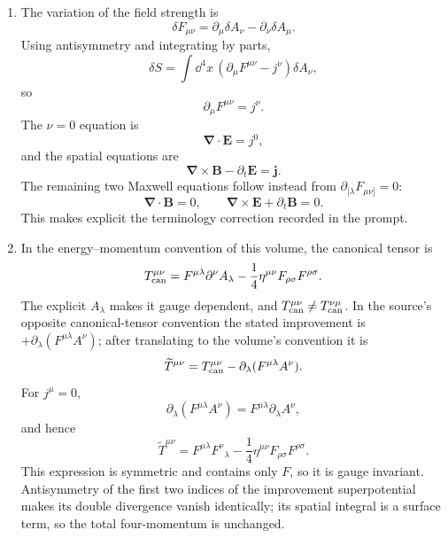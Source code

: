 \begin{enumerate}
\begin{enumerate}
\item
The variation of the field strength is
\[
 \delta F_{\mu\nu}
 =\partial_\mu\delta A_\nu-\partial_\nu\delta A_\mu.
\]
Using antisymmetry and integrating by parts,
\[
 \delta S
 =\int \dd^4x\,
 \left(\partial_\mu F^{\mu\nu}-j^\nu\right)\delta A_\nu,
\]
so
\[
 \partial_\mu F^{\mu\nu}=j^\nu.
\]
The \(\nu=0\) equation is
\[
 \boldsymbol\nabla\cdot\mathbf E=j^0,
\]
and the spatial equations are
\[
 \boldsymbol\nabla\times\mathbf B-\partial_t\mathbf E
 =\mathbf j.
\]
The remaining two Maxwell equations follow instead from
\(\partial_{[\lambda}F_{\mu\nu]}=0\):
\[
 \boldsymbol\nabla\cdot\mathbf B=0,\qquad
 \boldsymbol\nabla\times\mathbf E+\partial_t\mathbf B=0.
\]
This makes explicit the terminology correction recorded in the prompt.
\item
In the energy--momentum convention of this volume, the canonical tensor
is
\[
 T_{\rm can}^{\mu\nu}
 =F^{\mu\lambda}\partial^\nu A_\lambda
  -\frac14\eta^{\mu\nu}F_{\rho\sigma}F^{\rho\sigma}.
\]
The explicit \(A_\lambda\) makes it gauge dependent, and
\(T_{\rm can}^{\mu\nu}\ne T_{\rm can}^{\nu\mu}\).  In the source's
opposite canonical-tensor convention the stated improvement is
\(+\partial_\lambda(F^{\mu\lambda}A^\nu)\); after translating to the
volume's convention it is
\[
 \widetilde T^{\mu\nu}
 =T_{\rm can}^{\mu\nu}
 -\partial_\lambda(F^{\mu\lambda}A^\nu).
\]
For \(j^\mu=0\),
\[
 \partial_\lambda(F^{\mu\lambda}A^\nu)
 =F^{\mu\lambda}\partial_\lambda A^\nu,
\]
and hence
\[
 \widetilde T^{\mu\nu}
 =F^{\mu\lambda}F^\nu{}_\lambda
  -\frac14\eta^{\mu\nu}F_{\rho\sigma}F^{\rho\sigma}.
\]
This expression is symmetric and contains only \(F\), so it is gauge
invariant.  Antisymmetry of the first two indices of the improvement
superpotential makes its double divergence vanish identically; its
spatial integral is a surface term, so the total four-momentum is
unchanged.


\end{enumerate}
\end{enumerate}
